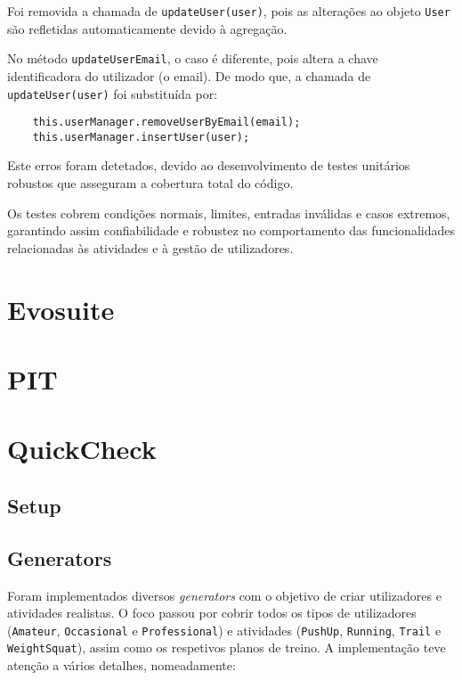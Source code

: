 \documentclass[12pt, a4paper]{article}
\begin{document}
Foi removida a chamada de \texttt{updateUser(user)}, pois as alterações ao objeto \texttt{User} são
refletidas automaticamente devido à agregação.

No método \texttt{updateUserEmail}, o caso é diferente, pois altera a chave identificadora do
utilizador (o email). De modo que, a chamada de \texttt{updateUser(user)} foi substituída por:
\begin{verbatim}
    this.userManager.removeUserByEmail(email);
    this.userManager.insertUser(user);
\end{verbatim}

Este erros foram detetados, devido ao desenvolvimento de testes unitários robustos que asseguram a
cobertura total do código.

Os testes cobrem condições normais, limites, entradas inválidas e casos extremos, garantindo assim
confiabilidade e robustez no comportamento das funcionalidades relacionadas às atividades e à gestão
de utilizadores.

\section{Evosuite}

\section{PIT}

\section{QuickCheck}

\subsection{Setup}

\subsection{Generators}

Foram implementados diversos \emph{generators} com o objetivo de criar utilizadores e atividades
realistas. O foco passou por cobrir todos os tipos de utilizadores (\texttt{Amateur},
\texttt{Occasional} e \texttt{Professional}) e atividades (\texttt{PushUp}, \texttt{Running},
\texttt{Trail} e \texttt{WeightSquat}), assim como os respetivos planos de treino. A implementação
teve atenção a vários detalhes, nomeadamente:
\end{document}
